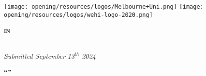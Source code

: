 % 
% 
% 



\thispagestyle{empty}

\setcounter{page}{1}




\begin{center}
    \texttt{[image: opening/resources/logos/Melbourne+Uni.png]}
    \hfill
    \texttt{[image: opening/resources/logos/wehi-logo-2020.png]}
\end{center}

\vspace*{30mm}

\begin{center}
    \textbf{\large \textsc{{\thesisDegree} in}}\\
    \textbf{\large \textsc{\thesisArea}}
\end{center}

\vspace*{0mm}

\begin{center}
    \textbf{\large \thesisType}\\
    \textit{Submitted September 13$^{th}$ 2024}
\end{center}

\vspace*{10mm}

\begin{center}
    \textbf{{\LARGE {}``\thesisTitle''}}\\
\end{center}

\vspace*{15mm}


